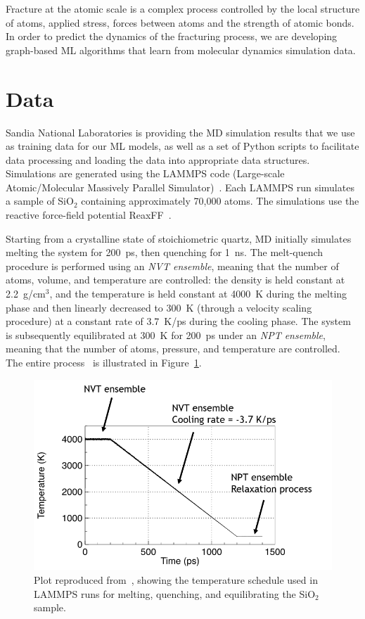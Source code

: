 Fracture at the atomic scale is a complex process controlled by the local structure of atoms, applied stress, forces between atoms and the strength of atomic bonds.  In order to predict the dynamics of the fracturing process, we are developing graph-based ML algorithms that learn from molecular dynamics simulation data.


\section{Data}
Sandia National Laboratories is providing the MD simulation results that we use as training data for our ML models, as well as a set of Python scripts to facilitate data processing and loading the data into appropriate data structures. Simulations are generated using the LAMMPS code (Large-scale Atomic/Molecular Massively Parallel Simulator)~\cite{PAMD}.  Each LAMMPS run simulates a sample of SiO$_2$ containing approximately 70,000 atoms. The simulations use the reactive force-field potential ReaxFF~\cite{pitman2012dynamics}.

Starting from a crystalline state of stoichiometric quartz, MD initially simulates melting the system for 200~ps, then quenching for 1~ns. The melt-quench procedure is performed using an \emph{NVT ensemble}, meaning that the number of atoms, volume, and temperature are controlled: the density is held constant at 2.2~g/cm$^3$, and the temperature is held constant at 4000~K during the melting phase and then linearly decreased to 300~K (through a velocity scaling procedure) at a constant rate of 3.7~K/ps during the cooling phase.  The system is subsequently equilibrated at 300~K for 200~ps under an \emph{NPT ensemble}, meaning that the number of atoms, pressure, and temperature are controlled. The entire process~\cite{markpres} is illustrated in Figure~\ref{fig:melt_quench}.

\begin{figure}[t]
    \centering
    \noindent
    \includegraphics{images/meltquench}
    \caption{Plot reproduced from~\cite{markpres}, showing the temperature schedule used in LAMMPS runs for melting, quenching, and equilibrating the SiO$_2$ sample.}
    \label{fig:melt_quench}
\end{figure}


